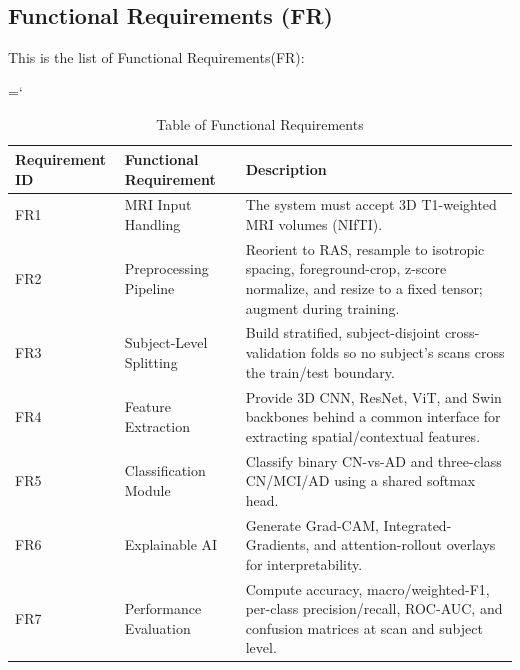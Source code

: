 \subsection{Functional Requirements (FR)}
This is the list of Functional Requirements(FR):
\begin{sloppypar}
\hyphenchar\font=`\-
\begin{longtable}{|p{3cm}|p{5cm}|p{6.5cm}|}
\caption{Table of Functional Requirements}\\
\hline
\textbf{Requirement ID} & \textbf{Functional Requirement} & \textbf{Description}\\
\hline
FR1 & MRI Input Handling & The system must accept 3D T1-weighted MRI volumes (NIfTI).\\
\hline
FR2 & Preprocessing Pipeline & Reorient to RAS, resample to isotropic spacing, foreground-crop, z-score normalize, and resize to a fixed tensor; augment during training.\\
\hline
FR3 & Subject-Level Splitting & Build stratified, subject-disjoint cross-validation folds so no subject's scans cross the train/test boundary.\\
\hline
FR4 & Feature Extraction & Provide 3D CNN, ResNet, ViT, and Swin backbones behind a common interface for extracting spatial/contextual features.\\
\hline
FR5 & Classification Module & Classify binary CN-vs-AD and three-class CN/MCI/AD using a shared softmax head.\\
\hline
FR6 & Explainable AI & Generate Grad-CAM, Integrated-Gradients, and attention-rollout overlays for interpretability.\\
\hline
FR7 & Performance Evaluation & Compute accuracy, macro/weighted-F1, per-class precision/recall, ROC-AUC, and confusion matrices at scan and subject level.\\
\hline
\end{longtable}
\end{sloppypar}

